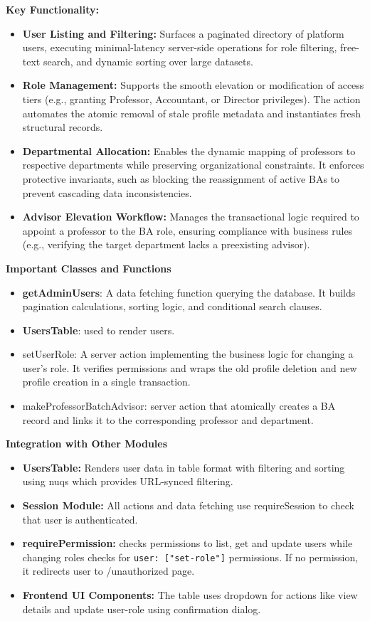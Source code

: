 \textbf{Key Functionality:}
\begin{itemize}
    \item \textbf{User Listing and Filtering:} Surfaces a paginated directory of platform users, executing minimal-latency server-side operations for role filtering, free-text search, and dynamic sorting over large datasets.
    \item \textbf{Role Management:} Supports the smooth elevation or modification of access tiers (e.g., granting Professor, Accountant, or Director privileges). The action automates the atomic removal of stale profile metadata and instantiates fresh structural records.
    \item \textbf{Departmental Allocation:} Enables the dynamic mapping of professors to respective departments while preserving organizational constraints. It enforces protective invariants, such as blocking the reassignment of active BAs to prevent cascading data inconsistencies.
    \item \textbf{Advisor Elevation Workflow:} Manages the transactional logic required to appoint a professor to the BA role, ensuring compliance with business rules (e.g., verifying the target department lacks a preexisting advisor).
\end{itemize}

\textbf{Important Classes and Functions}
\begin{itemize}
    \item \textbf{getAdminUsers}: A data fetching function querying the database. It builds pagination calculations, sorting logic, and conditional search clauses.
    \item \textbf{UsersTable}: used to render users.
    \item setUserRole: A server action implementing the business logic for changing a user's role. It verifies permissions and wraps the old profile deletion and new profile creation in a single transaction.
    \item makeProfessorBatchAdvisor: server action that atomically creates a BA record and links it to the corresponding professor and department.
\end{itemize}

\textbf{Integration with Other Modules}
\begin{itemize}
    \item \textbf{UsersTable:} Renders user data in table format with filtering and sorting using nuqs which provides URL-synced filtering.
    \item \textbf{Session Module:} All actions and data fetching use requireSession to check that user is authenticated.
    \item \textbf{requirePermission:} checks permissions to list, get and update users while changing roles checks for \texttt{user: ["set-role"]} permissions. If no permission, it redirects user to /unauthorized page.
    \item \textbf{Frontend UI Components:} The table uses dropdown for actions like view details and update user-role using confirmation dialog.
\end{itemize}

